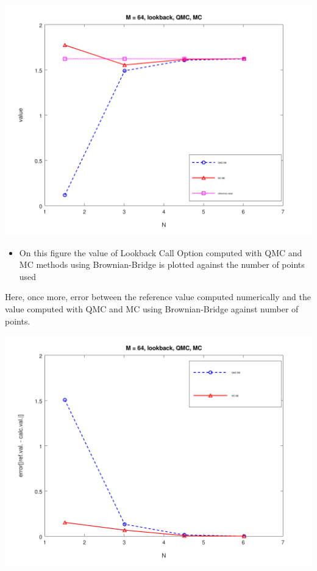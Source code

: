 \documentclass[10pt,a4paper]{article}
\begin{document}
\begin{center}
	\includegraphics[scale=0.35]{images/task6.png}
\end{center}
\begin{itemize}
    \item{
        On this figure the value of Lookback Call Option computed with QMC and MC methods using Brownian-Bridge is plotted against the number of points used
        
    }
     
\end{itemize}
Here, once more, error between the reference value computed numerically and the value computed with QMC and MC using Brownian-Bridge against number of points.
\begin{center}
	\includegraphics[scale=0.25]{images/task6_error.png}
\end{center}
\end{document}
